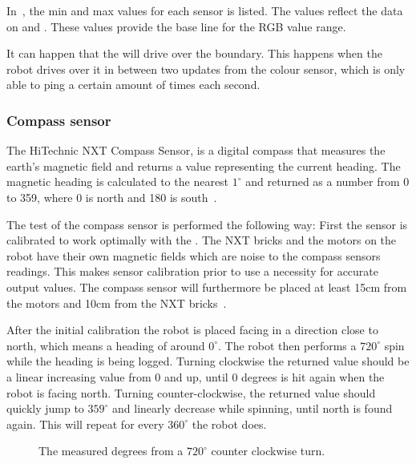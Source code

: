 In~, the min and max values for each sensor is listed. The values reflect the data on  and . These values provide the base line for the RGB value range.

It can happen that the \projname{} will drive over the boundary. This happens when the robot drives over it in between two updates from the colour sensor, which is only able to ping a certain amount of times each second. 

\subsubsection{Compass sensor}
The HiTechnic NXT Compass Sensor, is a digital compass that measures the earth's magnetic field and returns a value representing the current heading. The magnetic heading is calculated to the nearest $1^\circ$ and returned as a number from 0 to 359, where 0 is north and 180 is south~\citep{compass}.

The test of the compass sensor is performed the following way: First the sensor is calibrated to work optimally with the \projname{}. The NXT bricks and the motors on the robot have their own magnetic fields which are noise to the compass sensors readings. This makes sensor calibration prior to use a necessity for accurate output values. The compass sensor will furthermore be placed at least 15cm from the motors and 10cm from the NXT bricks~\citep{compass}.

After the initial calibration the robot is placed facing in a direction close to north, which means a heading of around $0^\circ$. The robot then performs a $720^\circ$ spin while the heading is being logged. Turning clockwise the returned value should be a linear increasing value from 0 and up, until 0 degrees is hit again when the robot is facing north. Turning counter-clockwise, the returned value should quickly jump to $359^\circ$ and linearly decrease while spinning, until north is found again. This will repeat for every $360^\circ$ the robot does.

\begin{figure}[H]
     \caption{\label{fig:compass_sensor_test_graph} The measured degrees from a $720^\circ$ counter clockwise turn.}
\end{figure}

